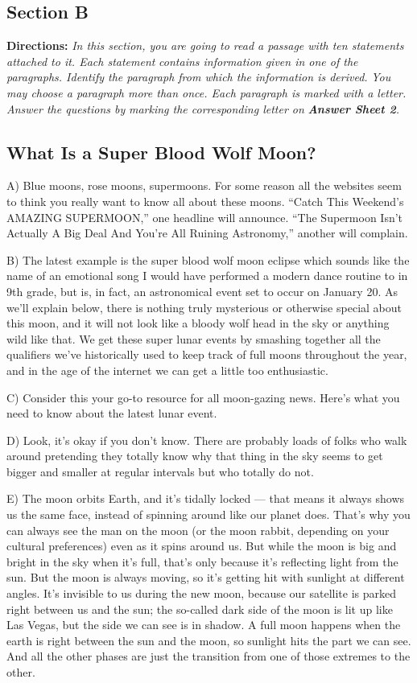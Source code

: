 \documentclass[UTF8,11pt]{ctexart}
\begin{document}
\subsection*{\textbf{Section B}}


\textbf{Directions:} \textit{In this section, you are going to read a passage with ten statements attached to it. Each statement} \textit{contains information given in one of the paragraphs. Identify the paragraph from which the information is derived.} \textit{You may choose a paragraph more than once. Each paragraph is marked with a letter. Answer the questions by} \textit{marking the corresponding letter on }\textbf{\textit{Answer Sheet 2}}\textit{.}


\subsection*{\textbf{What Is a Super Blood Wolf Moon?}}


A) Blue moons, rose moons, supermoons. For some reason all the websites seem to think you really want to know all about these moons. “Catch This Weekend’s AMAZING SUPERMOON,” one headline will announce. “The Supermoon Isn’t Actually A Big Deal And You’re All Ruining Astronomy,” another will complain.


B) The latest example is the super blood wolf moon eclipse which sounds like the name of an emotional song I would have performed a modern dance routine to in 9th grade, but is, in fact, an astronomical event set to occur on January 20. As we’ll explain below, there is nothing truly mysterious or otherwise special about this moon, and it will not look like a bloody wolf head in the sky or anything wild like that. We get these super lunar events by smashing together all the qualifiers we’ve historically used to keep track of full moons throughout the year, and in the age of the internet we can get a little too enthusiastic.


C) Consider this your go-to resource for all moon-gazing news. Here’s what you need to know about the latest lunar event.


D) Look, it’s okay if you don’t know. There are probably loads of folks who walk around pretending they totally know why that thing in the sky seems to get bigger and smaller at regular intervals but who totally do not.


E) The moon orbits Earth, and it’s tidally locked — that means it always shows us the same face, instead of spinning around like our planet does. That’s why you can always see the man on the moon (or the moon rabbit, depending on your cultural preferences) even as it spins around us. But while the moon is big and bright in the sky when it’s full, that’s only because it’s reflecting light from the sun. But the moon is always moving, so it’s getting hit with sunlight at different angles. It’s invisible to us during the new moon, because our satellite is parked right between us and the sun; the so-called dark side of the moon is lit up like Las Vegas, but the side we can see is in shadow. A full moon happens when the earth is right between the sun and the moon, so sunlight hits the part we can see. And all the other phases are just the transition from one of those extremes to the other.
\end{document}
